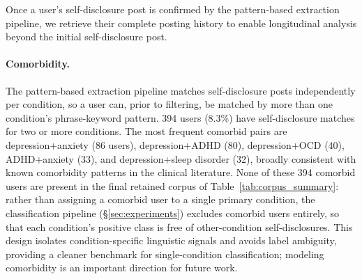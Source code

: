 \documentclass[11pt]{article}
\begin{document}
Once a user's self-disclosure post is confirmed by the pattern-based extraction pipeline, we retrieve their complete posting history to enable longitudinal analysis beyond the initial self-disclosure post.

\paragraph{Comorbidity.} The pattern-based extraction pipeline matches self-disclosure posts independently per condition, 
so a user can, prior to filtering, be matched by more than one condition's phrase-keyword pattern. 
394 users (8.3\%) have self-disclosure matches for two or more conditions. 
The most frequent comorbid pairs are depression+anxiety (86 users), depression+ADHD (80), depression+OCD (40), ADHD+anxiety (33), and depression+sleep disorder (32), broadly consistent with known comorbidity patterns in the clinical literature. None of these 394 comorbid users are present in the final retained corpus of Table~\ref{tab:corpus_summary}: rather than assigning a comorbid user to a single primary condition, the classification pipeline (§\ref{sec:experiments}) excludes comorbid users entirely, so that each condition's positive class is free of other-condition self-disclosures. This design isolates condition-specific linguistic signals and avoids label ambiguity, providing a cleaner benchmark for single-condition classification; modeling comorbidity is an important direction for future work.

\end{document}
